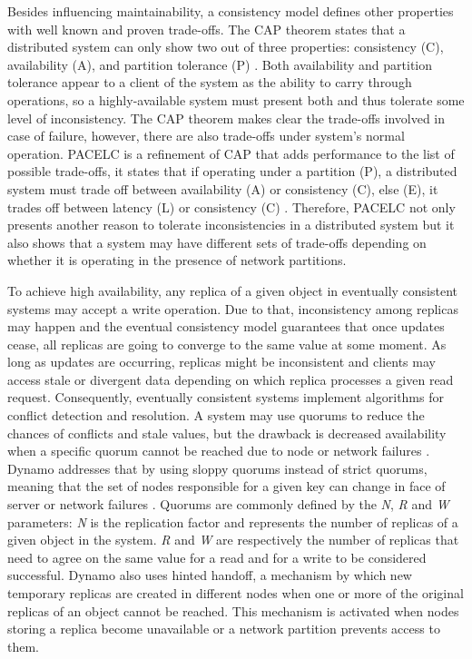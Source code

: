 \documentclass[man,floatsintext,12pt]{apa6}
\begin{document}
Besides influencing maintainability, a consistency model defines other
properties with well known and proven trade-offs. The CAP theorem states that a
distributed system can only show two out of three properties: consistency (C),
availability (A), and partition tolerance (P) \parencite{Brewer2000,Gilbert2002}.
Both availability and partition tolerance appear to a client of the system as
the ability to carry through operations, so a highly-available system must
present both and thus tolerate some level of inconsistency. The CAP theorem
makes clear the trade-offs involved in case of failure, however, there are also
trade-offs under system's normal operation. PACELC is a refinement of CAP that
adds performance to the list of possible trade-offs, it states that if
operating under a partition (P), a distributed system must trade off between
availability (A) or consistency (C), else (E), it trades off between latency
(L) or consistency (C) \parencite{Abadi2012}. Therefore, PACELC not only
presents another reason to tolerate inconsistencies in a distributed system but 
it also shows that a system may have different sets of trade-offs depending on
whether it is operating in the presence of network partitions.

To achieve high availability, any replica of a given object in eventually
consistent systems may accept a write operation. Due to that, inconsistency
among replicas may happen and the eventual consistency model guarantees that
once updates cease, all replicas are going to converge to the same value at
some moment. As long as updates are occurring, replicas might be inconsistent
and clients may access stale or divergent data depending on which replica
processes a given read request. Consequently, eventually consistent systems
implement algorithms for conflict detection and resolution. A system may use
quorums to reduce the chances of conflicts and stale values, but the drawback
is decreased availability when a specific quorum cannot be reached due to node
or network failures \parencite{Vogels2009}. Dynamo addresses that by using
sloppy quorums instead of strict quorums, meaning that the set of nodes
responsible for a given key can change in face of server or network failures
\parencite{DeCandia2007}.  Quorums are commonly defined by the \textit{N},
\textit{R} and \textit{W} parameters: \textit{N} is the replication factor and
represents the number of replicas of a given object in the system. \textit{R}
and \textit{W} are respectively the number of replicas that need to agree on
the same value for a read and for a write to be considered successful. Dynamo
also uses hinted handoff, a mechanism by which new temporary replicas are
created in different nodes when one or more of the original replicas of an
object cannot be reached.  This mechanism is activated when nodes storing a
replica become unavailable or a network partition prevents access to them.
\end{document}
